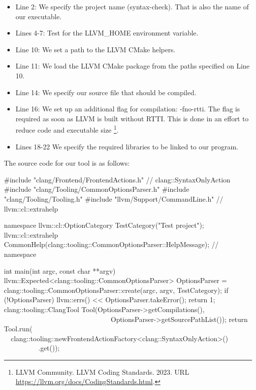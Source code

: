 \begin{itemize}
\item
Line 2: We specify the project name (syntax-check). That is also the name of our executable.

\item
Lines 4-7: Test for the LLVM\_HOME environment variable.

\item
Line 10: We set a path to the LLVM CMake helpers.

\item
Line 11: We load the LLVM CMake package from the paths specified on Line 10.

\item
Line 14: We specify our source file that should be compiled.

\item
Line 16: We set up an additional flag for compilation: -fno-rtti. The flag is required as soon as LLVM is built without RTTI. This is done in an effort to reduce code and executable size \footnote{LLVM Community. LLVM Coding Standards. 2023. URL \url{https://llvm.org/docs/CodingStandards.html}.}.

\item
Lines 18-22 We specify the required libraries to be linked to our program.
\end{itemize}

The source code for our tool is as follows:

\begin{cpp}
#include "clang/Frontend/FrontendActions.h" // clang::SyntaxOnlyAction
#include "clang/Tooling/CommonOptionsParser.h"
#include "clang/Tooling/Tooling.h"
#include "llvm/Support/CommandLine.h" // llvm::cl::extrahelp

namespace {
  llvm::cl::OptionCategory TestCategory("Test project");
  llvm::cl::extrahelp
    CommonHelp(clang::tooling::CommonOptionsParser::HelpMessage);
} // namespace

int main(int argc, const char **argv) {
  llvm::Expected<clang::tooling::CommonOptionsParser> OptionsParser =
    clang::tooling::CommonOptionsParser::create(argc, argv, TestCategory);
  if (!OptionsParser) {
    llvm::errs() << OptionsParser.takeError();
    return 1;
  }
  clang::tooling::ClangTool Tool(OptionsParser->getCompilations(),
                                 OptionsParser->getSourcePathList());
  return Tool.run(
    clang::tooling::newFrontendActionFactory<clang::SyntaxOnlyAction>()
            .get());
}
\end{cpp}

